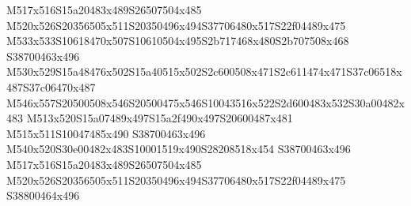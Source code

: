 \documentclass{article}
\begin{document}
\begin{multicols}{2}
M517x516S15a20483x489S26507504x485 M520x526S20356505x511S20350496x494S37706480x517S22f04489x475 M533x533S10618470x507S10610504x495S2b717468x480S2b707508x468 S38700463x496 M530x529S15a48476x502S15a40515x502S2c600508x471S2c611474x471S37c06518x487S37c06470x487 M546x557S20500508x546S20500475x546S10043516x522S2d600483x532S30a00482x483 M513x520S15a07489x497S15a2f490x497S20600487x481 M515x511S10047485x490 S38700463x496 M540x520S30e00482x483S10001519x490S28208518x454 S38700463x496 M517x516S15a20483x489S26507504x485 M520x526S20356505x511S20350496x494S37706480x517S22f04489x475 S38800464x496

\end{multicols}
\end{document}
